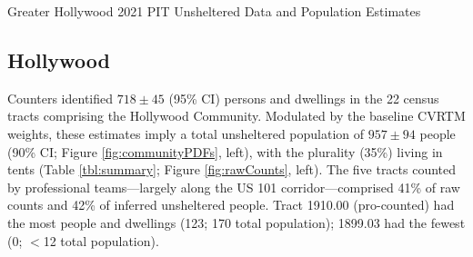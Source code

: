 \documentclass[11pt,twocolumn]{article}
\def\nch{718}
\def\nh{957\pm94}
\begin{document}

\begin{table}[t!]
\caption{Greater Hollywood 2021 PIT Unsheltered Data and Population Estimates}
\caption*{Parentheses denote 90\% uncertainties 
(binomial for categories). Uncertainties larger than estimates imply only upper limits are available. Marginalized
upper limits imply $<$3 unaccompanied minors and families in either community.}%
\label{tbl:summary}
\end{table}

\subsection{Hollywood}
\label{sec:hWood}

Counters identified $\nch\pm45$ (95\% CI) persons and dwellings in the 22 census tracts 
comprising the Hollywood Community. Modulated by the baseline CVRTM weights, these 
estimates imply a total unsheltered population of $\nh$ people 
(90\% CI; Figure \ref{fig:communityPDFs}, left), with the plurality (35\%) living in tents 
(Table \ref{tbl:summary}; Figure \ref{fig:rawCounts}, left). The five tracts counted by professional 
teams---largely along the US 101 corridor---comprised 41\% of raw counts and 42\% of inferred 
unsheltered people. Tract 1910.00 (pro-counted) had the most people and dwellings (123; 170
total population); 1899.03 had the fewest (0; $<$12 total population). %
\end{document}
